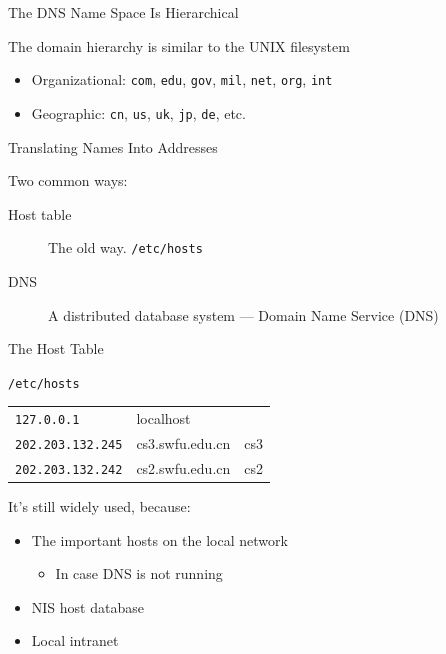 \begin{frame}{The DNS Name Space Is Hierarchical}
  \begin{block}{The domain hierarchy is similar to the UNIX filesystem}
    \begin{center}
    \end{center}\label{fig:dns_tree}
  \end{block}
  \begin{itemize}
  \item Organizational: \texttt{com}, \texttt{edu}, \texttt{gov}, \texttt{mil}, \texttt{net},
    \texttt{org}, \texttt{int}
  \item Geographic: \texttt{cn}, \texttt{us}, \texttt{uk}, \texttt{jp}, \texttt{de}, etc.
  \end{itemize}
\end{frame}

\begin{frame}{Translating Names Into Addresses}
  \begin{block}{Two common ways:}
    \begin{description}
    \item[Host table] The old way. \texttt{/etc/hosts}
    \item[DNS] A distributed database system --- Domain Name Service (DNS)
    \end{description}
  \end{block}
\end{frame}

\begin{frame}{The Host Table}
  \begin{block}{\texttt{/etc/hosts}}
    \begin{center}
      \begin{tabular}{lll}
        \texttt{127.0.0.1}&localhost&\\
        \texttt{202.203.132.245}&cs3.swfu.edu.cn&cs3\\
        \texttt{202.203.132.242}&cs2.swfu.edu.cn&cs2
      \end{tabular}
    \end{center}
  \end{block}
  \begin{block}{It's still widely used, because:}
    \begin{itemize}
    \item The important hosts on the local network
      \begin{itemize}
      \item In case DNS is not running
      \end{itemize}
    \item NIS host database
    \item Local intranet
    \end{itemize}
  \end{block}
\end{frame}

